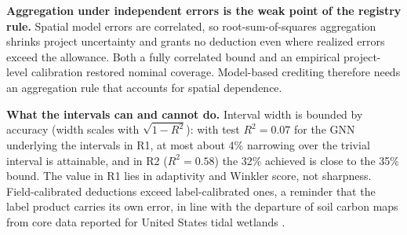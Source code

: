 \documentclass[conference]{IEEEtran}
\providecommand{\DIFadd}[1]{{\protect\color{addblue}#1}} %
\providecommand{\DIFaddbegin}{} %
\providecommand{\DIFaddend}{} %
\providecommand{\DIFdelbegin}{} %
\providecommand{\DIFdelend}{} %
\providecommand{\DIFscaledelfig}{0.5}
\newlength{\DIFdelgraphicswidth} %
\newlength{\DIFdelgraphicsheight} %
\providecommand{\DIFaddincludegraphics}[2][]{\DIFOincludegraphics[#1]{#2}} %
\providecommand{\DIFdelincludegraphics}[2][]{%
\sbox{\DIFdelgraphicsbox}{\DIFOincludegraphics[#1]{#2}}%
\settoboxwidth{\DIFdelgraphicswidth}{\DIFdelgraphicsbox} %
\settoboxtotalheight{\DIFdelgraphicsheight}{\DIFdelgraphicsbox} %
\scalebox{\DIFscaledelfig}{%
\parbox[b]{\DIFdelgraphicswidth}{\usebox{\DIFdelgraphicsbox}\\[-\baselineskip] \rule{\DIFdelgraphicswidth}{0em}}\llap{\resizebox{\DIFdelgraphicswidth}{\DIFdelgraphicsheight}{%
\setlength{\unitlength}{\DIFdelgraphicswidth}%
\begin{picture}(1,1)%
\thicklines\linethickness{2pt} %
{\color[rgb]{1,0,0}\put(0,0){\framebox(1,1){}}}%
{\color[rgb]{1,0,0}\put(0,0){\line( 1,1){1}}}%
{\color[rgb]{1,0,0}\put(0,1){\line(1,-1){1}}}%
\end{picture}%
}\hspace*{3pt}}} %
} %
\DeclareRobustCommand{\DIFaddbegin}{\DIFOaddbegin \let\includegraphics\DIFaddincludegraphics} %
\DeclareRobustCommand{\DIFaddend}{\DIFOaddend \let\includegraphics\DIFOincludegraphics} %
\DeclareRobustCommand{\DIFdelbegin}{\DIFOdelbegin \let\includegraphics\DIFdelincludegraphics} %
\DeclareRobustCommand{\DIFdelend}{\DIFOaddend \let\includegraphics\DIFOincludegraphics} %
\begin{document}
\DIFdelbegin %
\DIFdelend \DIFaddbegin \textbf{Aggregation under independent errors is the weak point of the registry rule.} \DIFadd{Spatial model errors are correlated, so root-sum-of-squares aggregation shrinks project uncertainty and grants no deduction even where realized errors exceed the allowance.
Both a fully correlated bound and an empirical project-level calibration restored nominal coverage.
Model-based crediting therefore needs an aggregation rule that accounts for spatial dependence.
}\DIFaddend 

\DIFdelbegin %
\DIFdelend \DIFaddbegin \textbf{What the intervals can and cannot do.} \DIFadd{Interval width is bounded by accuracy (width scales with $\sqrt{1-R^2}$): with test $R^2=0.07$ for the GNN underlying the intervals in R1, at most about 4\% narrowing over the trivial interval is attainable, and in R2 ($R^2=0.58$) the 32\% achieved is close to the 35\% bound.
The value in R1 lies in adaptivity and Winkler score, not sharpness.
Field-calibrated deductions exceed label-calibrated ones, a reminder that the label product carries its own error, in line with the departure of soil carbon maps from core data reported for United States tidal wetlands \DIFadd{\cite{holmquist2018tidal}}.
}\DIFaddend 
\end{document}
